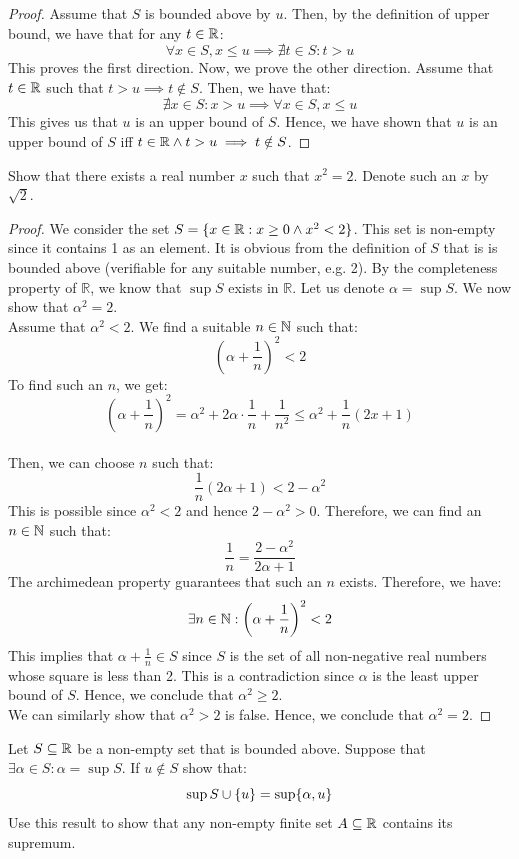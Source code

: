 \documentclass[openany]{book}
\begin{document}
\begin{proof}
    Assume that $S$ is bounded above by $u$. Then, by the definition of upper bound, we have that for any $t \in \mathbb{R}$: 
    $$\forall x \in S, x \leq u \implies \nexists t \in S: t > u$$
    This proves the first direction. Now, we prove the other direction. Assume that $t \in \mathbb{R}$ such that $t > u \implies t \notin S$. Then, we have that: 
    $$\nexists x \in S: x > u \implies \forall x \in S, x \leq u$$
    This gives us that $u$ is an upper bound of $S$. Hence, we have shown that $u$ is an upper bound of $S$ iff $t \in \mathbb{R} \wedge t > u \implies t \notin S$.
\end{proof}
\begin{exercise}
    Show that there exists a real number $x$ such that $x^2 = 2$. Denote such an $x$ by $\sqrt{2}$.
\end{exercise}
\begin{proof}
We consider the set $S = \{x \in \mathbb{R}: x \geq 0 \wedge x^2 < 2\}$. This set is non-empty since it contains 1 as an element. It is obvious from the definition of $S$ that is is bounded above (verifiable for any suitable number, e.g. 2). By the completeness property of $\mathbb{R}$, we know that $\sup S$ exists in $\mathbb{R}$. Let us denote $\alpha = \sup S$. We now show that $\alpha^2 = 2$. \\
Assume that $\alpha^2 < 2$. 
We find a suitable $n \in \mathbb{N}$ such that: 
$$\left(\alpha + \frac{1}{n}\right)^2 < 2$$
To find such an $n$, we get:
$$\left(\alpha + \frac{1}{n}\right)^2 = \alpha^2 + 2\alpha \cdot \frac{1}{n} + \frac{1}{n^2} \leq \alpha^2 + \frac{1}{n}(2x+1)$$ \\ 
Then, we can choose $n$ such that:
$$\frac{1}{n}(2\alpha + 1) < 2 - \alpha^2$$
This is possible since $\alpha^2 < 2$ and hence $2 - \alpha^2 > 0$. Therefore, we can find an $n \in \mathbb{N}$ such that:
$$\frac{1}{n} = \frac{2 - \alpha^2}{2\alpha + 1}$$
The archimedean property guarantees that such an $n$ exists. Therefore, we have:
$$\exists n \in \mathbb{N}: \left(\alpha + \frac{1}{n}\right)^2 < 2$$
This implies that $\alpha + \frac{1}{n} \in S$ since $S$ is the set of all non-negative real numbers whose square is less than 2. This is a contradiction since $\alpha$ is the least upper bound of $S$. Hence, we conclude that $\alpha^2 \geq 2$. \\
We can similarly show that $\alpha^2 > 2$ is false. Hence, we conclude that $\alpha^2 = 2$. 
\end{proof}
\begin{exercise}
    Let $S \subseteq \mathbb{R}$ be a non-empty set that is bounded above. Suppose that $ \exists \alpha \in S: \alpha = \sup S$. If $u \notin S$ show that: 
    $$\sup S \cup \{u\} = \sup \{\alpha, u\}$$
    Use this result to show that any non-empty finite set $A \subseteq \mathbb{R}$ contains its supremum. 
\end{exercise}
\end{document}
